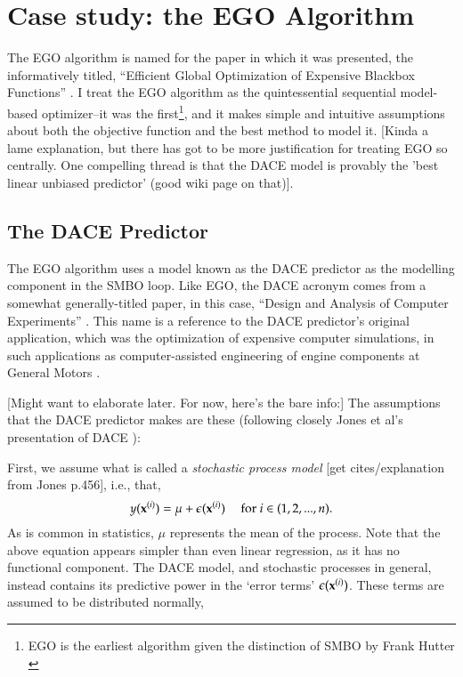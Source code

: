 \chapter{Case study: the EGO Algorithm}\label{ch:ego}

The EGO algorithm is named for the paper in which it was presented, the informatively titled, ``Efficient Global Optimization of Expensive Blackbox Functions'' \citep{jones_efficient_1998}. I treat the EGO algorithm as the quintessential sequential model-based optimizer--it was the first\footnote{EGO is the earliest algorithm given the distinction of SMBO by Frank Hutter \citeyear{hutter_automated_2009}}, and it makes simple and intuitive assumptions about both the objective function and the best method to model it. [Kinda a lame explanation, but there has got to be more justification for treating EGO so centrally. One compelling thread is that the DACE model is provably the 'best linear unbiased predictor' (good wiki page on that)]. 

\section{The DACE Predictor}\label{sec:dace}
The EGO algorithm uses a model known as the DACE predictor as the modelling component in the SMBO loop. Like EGO, the DACE acronym comes from a somewhat generally-titled paper, in this case, ``Design and Analysis of Computer Experiments'' \citep{sacks_design_1989}. This name is a reference to the DACE predictor's original application, which was the optimization of expensive computer simulations, in such applications as computer-assisted engineering of engine components at General Motors \cite{jones_efficient_1998}.


[Might want to elaborate later. For now, here's the bare info:] The assumptions that the DACE predictor makes are these (following closely Jones et al's presentation of DACE \cite{jones_efficient_1998}):

First, we assume what is called a \emph{stochastic process model} [get cites/explanation from Jones p.456], i.e., that,
\begin{equation} \label{eq:stoch_proc}
y(\mathbf{x}^{(i)}) = \mu + \epsilon(\mathbf{x}^{(i)}) \ \ \ \ \ \text{for } i \in (1,2,...,n).
\end{equation}
As is common in statistics, $\mu$ represents the mean of the process. Note that the above equation appears simpler than even linear regression, as it has no functional component. The DACE model, and stochastic processes in general, instead contains its predictive power in the `error terms' $\epsilon(\mathbf{x}^{(i)})$. These terms are assumed to be distributed normally,

